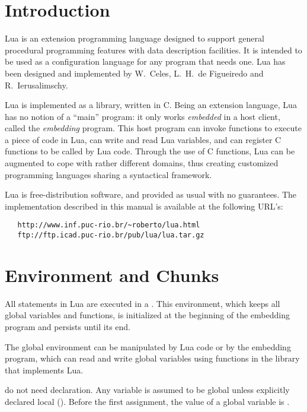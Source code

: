 \section{Introduction}

Lua is an extension programming language designed to support
general procedural programming features with data description
facilities.
It is intended to be used as a configuration language for any
program that needs one.
Lua has been designed and implemented by
W.~Celes, L.~H.~de Figueiredo and R.~Ierusalimschy.

Lua is implemented as a library, written in C.
Being an extension language, Lua has no notion of a ``main'' program:
it only works {\em embedded} in a host client,
called the {\em embedding} program.
This host program can invoke functions to execute a piece of
code in Lua, can write and read Lua variables,
and can register C functions to be called by Lua code.
Through the use of C functions, Lua can be augmented to cope with
rather different domains,
thus creating customized programming languages sharing a syntactical framework.

Lua is free-distribution software,
and provided as usual with no guarantees.
The implementation described in this manual is available
at the following URL's:
\begin{verbatim}
   http://www.inf.puc-rio.br/~roberto/lua.html
   ftp://ftp.icad.puc-rio.br/pub/lua/lua.tar.gz
\end{verbatim}


\section{Environment and Chunks}

All statements in Lua are executed in a .
This environment, which keeps all global variables and functions,
is initialized at the beginning of the embedding program and
persists until its end.

The global environment can be manipulated by Lua code or
by the embedding program,
which can read and write global variables
using functions in the library that implements Lua.

 do not need declaration.
Any variable is assumed to be global unless explicitly declared local
().
Before the first assignment, the value of a global variable is \nil.

